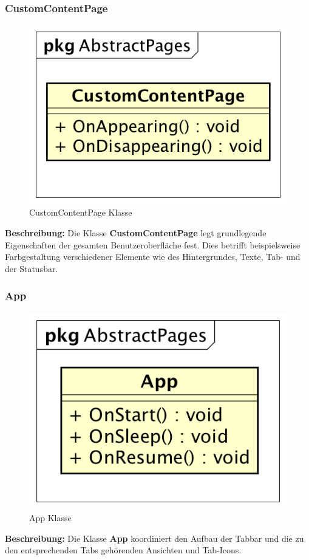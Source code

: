 \documentclass[a4paper]{scrreprt}
\begin{document}
\subsubsection{CustomContentPage}
\begin{figure}[H]
\centering
\includegraphics[width=0.45\textheight]{graphics/Klassendiagramme/View/CustomContentPage.png}
\caption{CustomContentPage Klasse}
\end{figure}
\textbf{Beschreibung:} Die Klasse \textbf{CustomContentPage} legt grundlegende Eigenschaften der gesamten Benutzeroberfläche fest. Dies betrifft beispielsweise Farbgestaltung verschiedener Elemente wie des Hintergrundes, Texte, Tab- und der Statusbar.

\subsubsection{App}
\begin{figure}[H]
\centering
\includegraphics[width=0.45\textheight]{graphics/Klassendiagramme/View/App.png}
\caption{App Klasse}
\end{figure}
\textbf{Beschreibung:} Die Klasse \textbf{App} koordiniert den Aufbau der Tabbar und die zu den entsprechenden Tabs gehörenden Ansichten und Tab-Icons.
\end{document}
